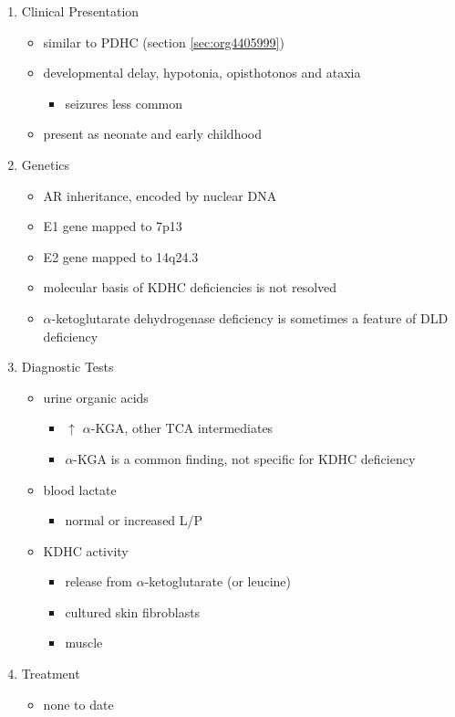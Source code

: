 \documentclass{scrartcl}
\begin{document}
\begin{enumerate}
\item Clinical Presentation
\label{sec:orgeebf4d8}
\begin{itemize}
\item similar to PDHC (section \ref{sec:org4405999})
\item developmental delay, hypotonia, opisthotonos and ataxia
\begin{itemize}
\item seizures less common
\end{itemize}
\item present as neonate and early childhood
\end{itemize}

\item Genetics
\label{sec:orge5c7091}
\begin{itemize}
\item AR inheritance, encoded by nuclear DNA
\item E1 gene mapped to 7p13
\item E2 gene mapped to 14q24.3
\item molecular basis of KDHC deficiencies is not resolved
\item \(\alpha\)-ketoglutarate dehydrogenase deficiency is sometimes a feature of DLD deficiency
\end{itemize}

\item Diagnostic Tests
\label{sec:org54bb060}
\begin{itemize}
\item urine organic acids
\begin{itemize}
\item \(\uparrow\) \(\alpha\)-KGA, \textpm{} other TCA intermediates
\item \(\alpha\)-KGA is a common finding, not specific for KDHC deficiency
\end{itemize}
\item blood lactate
\begin{itemize}
\item normal or increased L/P
\end{itemize}
\item KDHC activity
\begin{itemize}
\item {} release from \ce{[1-^14C]} \(\alpha\)-ketoglutarate (or \ce{[1-^14C]} leucine)
\item cultured skin fibroblasts
\item muscle
\end{itemize}
\end{itemize}

\item Treatment
\label{sec:org4dc76f2}
\begin{itemize}
\item none to date
\end{itemize}
\end{enumerate}
\end{document}
